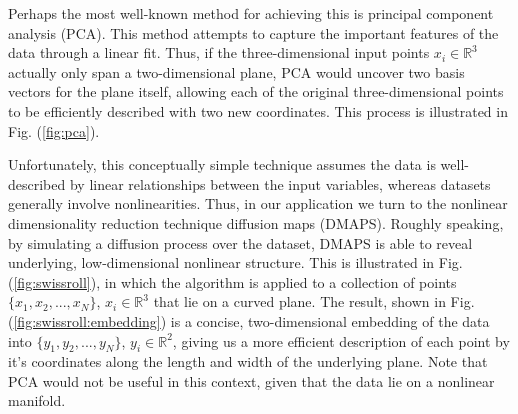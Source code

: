 \documentclass[11pt]{article}
\begin{document}
Perhaps the most well-known method for achieving this is principal component analysis (PCA). This method attempts to capture the important features of the data through a linear fit. Thus, if the three-dimensional input points $x_i \in \mathbb{R}^3$ actually only span a two-dimensional plane, PCA would uncover two basis vectors for the plane itself, allowing each of the original three-dimensional points to be efficiently described with two new coordinates. This process is illustrated in Fig. (\ref{fig:pca}).

Unfortunately, this conceptually simple technique assumes the data is well-described by linear relationships between the input variables, whereas datasets generally involve nonlinearities. Thus, in our application we turn to the nonlinear dimensionality reduction technique diffusion maps (DMAPS). Roughly speaking, by simulating a diffusion process over the dataset, DMAPS is able to reveal underlying, low-dimensional nonlinear structure. This is illustrated in Fig. (\ref{fig:swissroll}), in which the algorithm is applied to a collection of points $\{x_1, x_2, ..., x_N\}$, $x_i \in \mathbb{R}^3$ that lie on a curved plane. The result, shown in Fig. (\ref{fig:swissroll:embedding}) is a concise, two-dimensional embedding of the data into $\{y_1, y_2, ..., y_N\}$, $y_i \in \mathbb{R}^2$, giving us a more efficient description of each point by it's coordinates along the length and width of the underlying plane. Note that PCA would not be useful in this context, given that the data lie on a nonlinear manifold.
\end{document}
